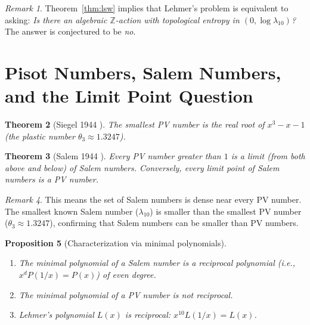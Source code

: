 \documentclass[12pt,a4paper]{amsart}
\newtheorem{theorem}{Theorem}[section]
\newtheorem{proposition}[theorem]{Proposition}
\theoremstyle{definition}
\theoremstyle{remark}
\newtheorem{remark}[theorem]{Remark}
\newcommand{\Z}{\mathbb{Z}}
\begin{document}
\begin{remark}
  Theorem~\ref{thm:lsw} implies that Lehmer's problem is equivalent to asking:
  \emph{Is there an algebraic $\Z$-action with topological entropy in $(0, \log\lambda_{10})$?}
  The answer is conjectured to be \emph{no}.
\end{remark}

\section{Pisot Numbers, Salem Numbers, and the Limit Point Question}\label{sec:pisot}

\begin{theorem}[Siegel 1944 \cite{Siegel1944}]
  The smallest PV number is the real root of $x^3 - x - 1$ (the plastic number
  $\theta_3 \approx 1.3247$).
\end{theorem}

\begin{theorem}[Salem 1944 \cite{Salem1944}]
  Every PV number greater than $1$ is a limit (from both above and below) of Salem numbers.
  Conversely, every limit point of Salem numbers is a PV number.
\end{theorem}

\begin{remark}
  This means the set of Salem numbers is dense near every PV number.
  The smallest known Salem number ($\lambda_{10}$) is smaller than the smallest PV number
  ($\theta_3 \approx 1.3247$), confirming that Salem numbers can be smaller than PV numbers.
\end{remark}

\begin{proposition}[Characterization via minimal polynomials]
  \begin{enumerate}[label=(\roman*)]
    \item The minimal polynomial of a Salem number is a reciprocal polynomial
      (i.e., $x^d P(1/x) = P(x)$) of even degree.
    \item The minimal polynomial of a PV number is not reciprocal.
    \item Lehmer's polynomial $L(x)$ is reciprocal: $x^{10}L(1/x) = L(x)$.
  \end{enumerate}
\end{proposition}

\end{document}
